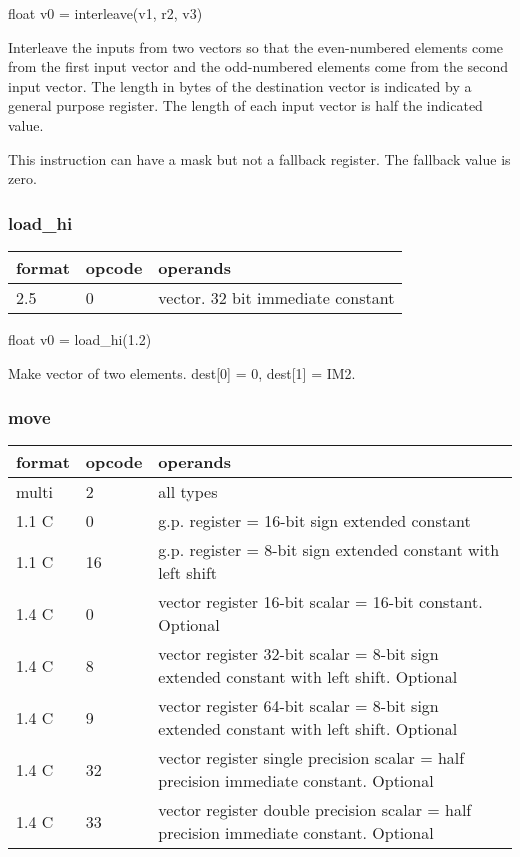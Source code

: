 \documentclass[forwardcom.tex]{subfiles}
\begin{document}
float v0 = interleave(v1, r2, v3)
\vspace{2mm}

Interleave the inputs from two vectors so that the even-numbered elements come from the first input vector and the odd-numbered elements come from the second input vector. The length in bytes of the destination vector is indicated by a general purpose register. The length of each input vector is half the indicated value.
\vspace{2mm}

This instruction can have a mask but not a fallback register. The fallback value is zero.

\subsubsection{load\_hi}
\label{table:loadHiInstruction}
\begin{tabular}{|p{12mm}|p{12mm}|p{110mm}|}
\hline
\bfseries format & \bfseries opcode & \bfseries operands \\ \hline
2.5 & 0 & vector. 32 bit immediate constant \\ \hline
\end{tabular}
\vspace{2mm}

float v0 = load\_hi(1.2)
\vspace{2mm}

Make vector of two elements. dest[0] = 0, dest[1] = IM2.
\vspace{2mm}

\subsubsection{move}
\label{table:moveInstruction}
\begin{tabular}{|p{12mm}|p{12mm}|p{110mm}|}
\hline
\bfseries format & \bfseries opcode & \bfseries operands \\ \hline
multi & 2 & all types \\ \hline
1.1 C &  0 & g.p. register = 16-bit sign extended constant \\ \hline
1.1 C & 16 & g.p. register = 8-bit sign extended constant with left shift \\ \hline
1.4 C &  0 & vector register 16-bit scalar = 16-bit constant. Optional  \\ \hline
1.4 C &  8 & vector register 32-bit scalar = 8-bit sign extended constant with left shift. Optional \\ \hline
1.4 C &  9 & vector register 64-bit scalar = 8-bit sign extended constant with left shift. Optional \\ \hline
1.4 C & 32 & vector register single precision scalar = half precision immediate constant. Optional \\ \hline
1.4 C & 33 & vector register double precision scalar = half precision immediate constant. Optional \\ \hline
\end{tabular}
\vspace{2mm}
\end{document}
